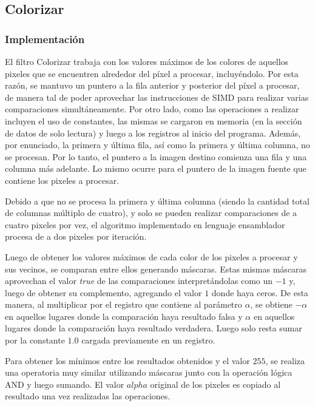 \documentclass[a4paper]{article}
\begin{document}
\newpage

\subsection{Colorizar}
\subsubsection{Implementación}

El filtro Colorizar trabaja con los valores máximos de los colores de aquellos pixeles que se encuentren alrededor del píxel a procesar, incluyéndolo. Por esta razón, se mantuvo un puntero a la fila anterior y posterior del píxel a procesar, de manera tal de poder aprovechar las instrucciones de SIMD para realizar varias comparaciones simultáneamente. Por otro lado, como las operaciones a realizar incluyen el uso de constantes, las mismas se cargaron en memoria (en la sección de datos de solo lectura) y luego a los registros al inicio del programa. Además, por enunciado, la primera y última fila, así como la primera y última columna, no se procesan. Por lo tanto, el puntero a la imagen destino comienza una fila y una columna más adelante. Lo mismo ocurre para el puntero de la imagen fuente que contiene los pixeles a procesar. 

Debido a que no se procesa la primera y última columna (siendo la cantidad total de columnas múltiplo de cuatro), y solo se pueden realizar comparaciones de a cuatro pixeles por vez, el algoritmo implementado en lenguaje ensamblador procesa de a dos pixeles por iteración.

Luego de obtener los valores máximos de cada color de los pixeles a procesar y sus vecinos, se comparan entre ellos generando máscaras. Estas mismas máscaras aprovechan el valor \textit{true} de las comparaciones interpretándolas como un $-1$ y, luego de obtener su complemento, agregando el valor $1$ donde haya ceros. De esta manera, al multiplicar por el registro que contiene al parámetro $\alpha$, se obtiene $-\alpha$ en aquellos lugares donde la comparación haya resultado falsa y $\alpha$ en aquellos lugares donde la comparación haya resultado verdadera. Luego solo resta sumar por la constante $1.0$ cargada previamente en un registro. 

Para obtener los mínimos entre los resultados obtenidos y el valor $255$, se realiza una operatoria muy similar utilizando máscaras junto con la operación lógica AND y luego sumando. El valor $alpha$ original de los pixeles es copiado al resultado una vez realizadas las operaciones.
\bigskip
\end{document}

